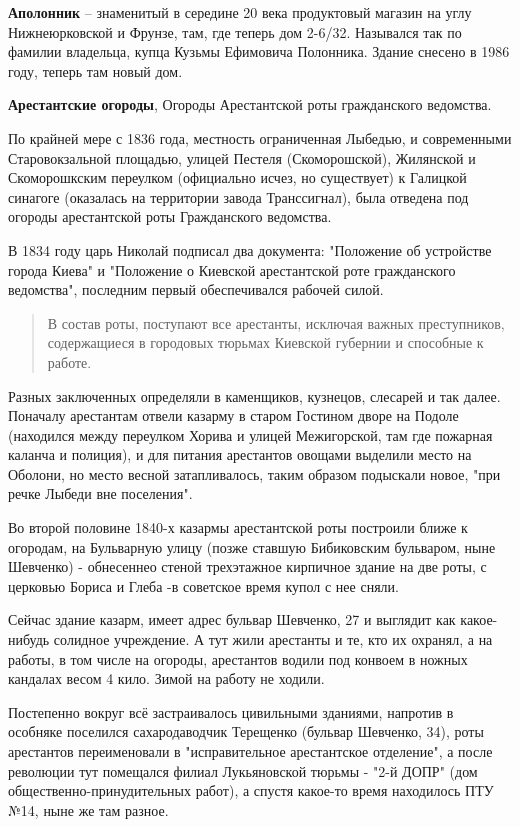 \textbf{Аполонник} – знаменитый в середине 20 века продуктовый магазин на углу Нижнеюрковской и Фрунзе, там, где теперь дом 2-6/32. Назывался так по фамилии владельца, купца Кузьмы Ефимовича Полонника. Здание снесено в 1986 году, теперь там новый дом.\\

\medskip


\textbf{Арестантские огороды}, Огороды Арестантской роты гражданского ведомства.

По крайней мере с 1836 года, местность ограниченная Лыбедью, и современными Старовокзальной площадью, улицей Пестеля (Скоморошской), Жилянской и Скоморошкским переулком (официально исчез, но существует) к Галицкой синагоге (оказалась на территории завода Транссигнал), была отведена под огороды арестантской роты Гражданского ведомства.

В 1834 году царь Николай подписал два документа: "Положение об устройстве города Киева" и "Положение о Киевской арестантской роте гражданского ведомства", последним первый обеспечивался рабочей силой.

\begin{quotation}
В состав роты, поступают все арестанты, исключая важных преступников, содержащиеся в городовых тюрьмах Киевской губернии и способные к работе.
\end{quotation}

Разных заключенных определяли в каменщиков, кузнецов, слесарей и так далее. Поначалу арестантам отвели казарму в старом Гостином дворе на Подоле (находился между переулком Хорива и улицей Межигорской, там где пожарная каланча и полиция), и для питания арестантов овощами выделили место на Оболони, но место весной затапливалось, таким образом подыскали новое, "при речке Лыбеди вне поселения".

Во второй половине 1840-х казармы арестантской роты построили ближе к огородам, на Бульварную улицу (позже ставшую Бибиковским бульваром, ныне Шевченко) - обнесеннео стеной трехэтажное кирпичное здание на две роты, с церковью Бориса и Глеба  -в советское время купол с нее сняли.  

Сейчас здание казарм, имеет адрес бульвар Шевченко, 27 и выглядит как какое-нибудь солидное учреждение. А тут жили арестанты и те, кто их охранял, а на работы, в том числе на огороды, арестантов водили под конвоем в ножных кандалах весом 4 кило. Зимой на работу не ходили.

Постепенно вокруг всё застраивалось цивильными зданиями, напротив в особняке поселился сахародаводчик Терещенко (бульвар Шевченко, 34), роты арестантов переименовали в "исправительное арестантское отделение", а после революции тут помещался филиал Лукьяновской тюрьмы - "2-й ДОПР" (дом общественно-принудительных работ), а спустя какое-то время находилось ПТУ №14, ныне же там разное.

